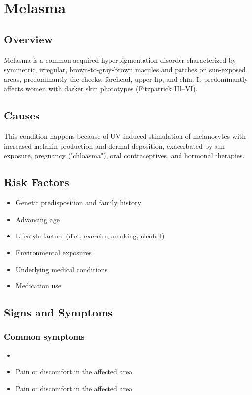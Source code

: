 \chapter{Melasma}
\label{sec:Melasma}

\section{Overview}
Melasma is a common acquired hyperpigmentation disorder characterized by symmetric, irregular, brown-to-gray-brown macules and patches on sun-exposed areas, predominantly the cheeks, forehead, upper lip, and chin. It predominantly affects women with darker skin phototypes (Fitzpatrick III--VI).
\section{Causes}
This condition happens because of UV-induced stimulation of melanocytes with increased melanin production and dermal deposition, exacerbated by sun exposure, pregnancy ("chloasma"), oral contraceptives, and hormonal therapies.     
\section{Risk Factors}

\begin{itemize}[noitemsep]
  \item Genetic predisposition and family history
  \item Advancing age
  \item Lifestyle factors (diet, exercise, smoking, alcohol)
  \item Environmental exposures
  \item Underlying medical conditions
  \item Medication use
\end{itemize}
\section{Signs and Symptoms}

\subsection{Common symptoms}
\begin{itemize}[noitemsep]
  \item \item Pain or discomfort in the affected area    \item Pain or discomfort in the affected area
  \end{itemize}

